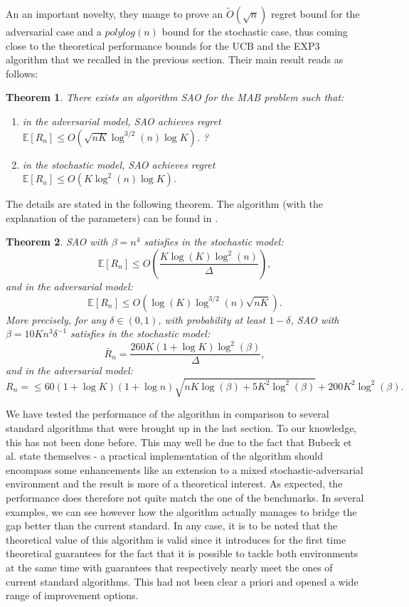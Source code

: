 \documentclass[10.5pt]{article}
\newtheorem{theorem}{Theorem}
\begin{document}
An an important novelty, they mange to prove an $\tilde{O}(\sqrt{n})$ regret bound for the adversarial case and a $polylog(n)$ bound for the stochastic case, thus coming close to the theoretical performance bounds for the UCB and the EXP3 algorithm that we recalled in the previous section. Their main result reads as follows:
\begin{theorem}
There exists an algorithm SAO for the MAB problem such that:
\begin{enumerate}
\item[(a)] in the adversarial model, SAO achieves regret $\mathbb{E}[R_n] \leq O(\sqrt{nK} \log^{3/2}(n) \log K)$.
?\item[(b)] in the stochastic model, SAO achieves regret $\mathbb{E}[R_n] \leq O(K \log^{2}(n) \log K)$.\end{enumerate}
\end{theorem}

The details are stated in the following theorem. The algorithm (with the explanation of the parameters) can be found in \cite{Bube12}.
\begin{theorem}
SAO with $\beta = n^4$ satisfies in the stochastic model:
$$ \mathbb{E}[R_n] \leq O \left (\frac{K \log(K) \log^2(n)}{\Delta} \right),$$
and in the adversarial model:
$$\mathbb{E}[R_n] \leq O(\log(K) \log^{3/2}(n) \sqrt{nK}).$$
More precisely, for any $\delta \in (0,1)$, with probability at least $1-\delta$, SAO with $\beta = 10Kn^3 \delta^{-1}$ satisfies in the stochastic model:
$$\bar{R}_n = \frac{260K (1 + \log K) \log^2(\beta)}{\Delta},$$
and in the adversarial model:
$$R_n = \leq 60(1 + \log K) (1 + \log n) \sqrt{nK \log(\beta) + 5 K^2 \log^2(\beta)} + 200K^2 \log^2(\beta).$$
\end{theorem}

We have tested the performance of the algorithm in comparison to several standard algorithms that were brought up in the last section. To our knowledge, this has not been done before. This may well be due to the fact that Bubeck et al. state themselves - a practical implementation of the algorithm should encompass some enhancements like an extension to a mixed stochastic-adversarial environment and the result is more of a theoretical interest. As expected, the performance does therefore not quite match the one of the benchmarks. In several examples, we can see however how the algorithm actually manages to bridge the gap better than the current standard. In any case, it is to be noted that the theoretical value of this algorithm is valid since it introduces for the first time theoretical guarantees for the fact that it is possible to tackle both environments at the same time with guarantees that respectively nearly meet the ones of current standard algorithms. This had not been clear a priori and opened a wide range of improvement options.
\end{document}
